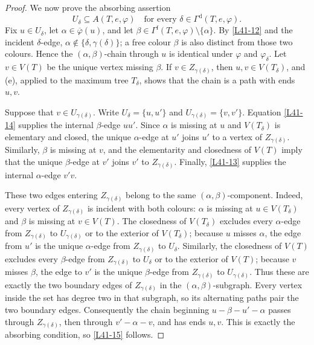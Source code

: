 \documentclass[11pt]{article}
\theoremstyle{definition}
\newcommand{\Dcol}{\Gamma^{\mathrm d}}
\newcommand{\Fcol}{\Gamma^{\mathrm f}}
\newcommand{\set}[1]{\{#1\}}
\newcommand{\comp}{\mathbin{\setminus}}
\begin{document}
\begin{proof}
We now prove the absorbing assertion
\begin{equation}
 U_\delta\subseteq A(T,e,\varphi)
 \quad\text{for every }\delta\in\Dcol(T,e,\varphi).
 \tag{15}\label{L41-15}
\end{equation}
Fix $u\in U_\delta$, let $\alpha\in\overline\varphi(u)$, and let
$\beta\in\Fcol(T,e,\varphi)\comp\set\alpha$. By \eqref{L41-12} and the
incident $\delta$-edge, $\alpha\notin\set{\delta,\gamma(\delta)}$; a free
colour $\beta$ is also distinct from those two colours. Hence the
$(\alpha,\beta)$-chain through $u$ is identical under $\varphi$ and
$\varphi_\delta$. Let $v\in V(T)$ be the unique vertex missing $\beta$.
If $v\in Z_{\gamma(\delta)}$, then $u,v\in V(T_\delta)$, and
(e), applied to the maximum tree $T_\delta$,
shows that the chain is a path with ends $u,v$.

Suppose that $v\in U_{\gamma(\delta)}$. Write
$U_\delta=\set{u,u'}$ and
$U_{\gamma(\delta)}=\set{v,v'}$. Equation \eqref{L41-14} supplies the
internal $\beta$-edge $uu'$. Since $\alpha$ is missing at $u$ and
$V(T_\delta)$ is elementary and closed, the unique $\alpha$-edge at $u'$
joins $u'$ to a vertex of $Z_{\gamma(\delta)}$. Similarly, $\beta$ is
missing at $v$, and the elementarity and closedness of $V(T)$ imply that
the unique $\beta$-edge at $v'$ joins $v'$ to
$Z_{\gamma(\delta)}$. Finally, \eqref{L41-13} supplies the internal
$\alpha$-edge $v'v$.

These two edges entering $Z_{\gamma(\delta)}$ belong to the same
$(\alpha,\beta)$-component. Indeed, every vertex of
$Z_{\gamma(\delta)}$ is incident with both colours: $\alpha$ is missing at
$u\in V(T_\delta)$ and $\beta$ is missing at $v\in V(T)$. The closedness
of $V(T_\delta)$ excludes every $\alpha$-edge from
$Z_{\gamma(\delta)}$ to $U_{\gamma(\delta)}$ or to the exterior of
$V(T_\delta)$; because $u$ misses $\alpha$, the edge from $u'$ is the
unique $\alpha$-edge from $Z_{\gamma(\delta)}$ to $U_\delta$.
Similarly, the closedness of $V(T)$ excludes every $\beta$-edge from
$Z_{\gamma(\delta)}$ to $U_\delta$ or to the exterior of $V(T)$; because
$v$ misses $\beta$, the edge to $v'$ is the unique $\beta$-edge from
$Z_{\gamma(\delta)}$ to $U_{\gamma(\delta)}$. Thus these are exactly
the two boundary edges of $Z_{\gamma(\delta)}$ in the
$(\alpha,\beta)$-subgraph. Every vertex inside the set has degree two in
that subgraph, so its alternating paths pair the two boundary edges.
Consequently the chain beginning $u-\beta-u'-\alpha$ passes through
$Z_{\gamma(\delta)}$, then through $v'-\alpha-v$, and has ends $u,v$.
This is exactly the absorbing condition, so \eqref{L41-15} follows.


\end{proof}
\end{document}
